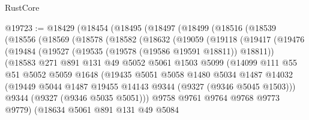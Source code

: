\begin{lexlean}{RustCore}
\begin{coremodule}
@19723 := @18429
    (@18454
      (@18495
        (@18497
          (@18499
            (@18516
              (@18539
                (@18556
                  (@18569
                    (@18578
                      (@18582
                        (@18632
                          (@19059
                            (@19118
                              (@19417
                                (@19476
                                  (@19484
                                    (@19527 (@19535 (@19578 (@19586 @19591 @18811)) @18811))
                                    (@18583
                                      @271
                                      @891
                                      @131
                                      @49
                                      @5052
                                      @5061
                                      @1503
                                      @5099
                                      (@14099
                                        @111
                                        @55
                                        @51
                                        @5052
                                        @5059
                                        @1648
                                        (@19435
                                          @5051
                                          @5058
                                          @1480
                                          @5034
                                          @1487
                                          @14032
                                          (@19449
                                            @5044
                                            @1487
                                            @19455
                                            @14143
                                            @9344
                                            (@9327 (@9346 @5045 @1503)))
                                          @9344
                                          (@9327 (@9346 @5035 @5051)))
                                        @9758
                                        @9761
                                        @9764
                                        @9768
                                        @9773
                                        @9779)
                                      (@18634
                                        @5061
                                        @891
                                        @131
                                        @49
                                        @5084

\end{coremodule}
\end{lexlean}
